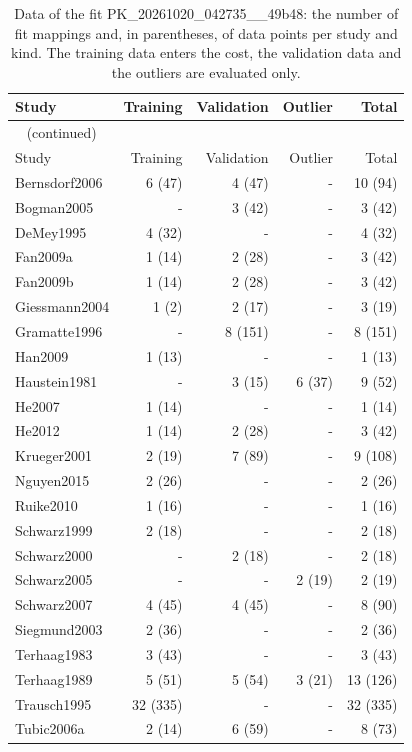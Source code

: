 \documentclass{article}
\begin{document}
\begin{longtable}{lrrrr}
\caption{Data of the fit PK\_20261020\_042735\_\_49b48: the number of fit mappings and, in parentheses, of data points per study and kind. The training data enters the cost, the validation data and the outliers are evaluated only.}\label{tab:data:PK_20261020_042735__49b48} \\
\toprule
Study & Training & Validation & Outlier & Total \\
\midrule
\endfirsthead
\multicolumn{5}{l}{\small\tablename~\thetable{} (continued)} \\
\toprule
Study & Training & Validation & Outlier & Total \\
\midrule
\endhead
\bottomrule
\endlastfoot
Bernsdorf2006 & 6 (47) & 4 (47) & - & 10 (94) \\
Bogman2005 & - & 3 (42) & - & 3 (42) \\
DeMey1995 & 4 (32) & - & - & 4 (32) \\
Fan2009a & 1 (14) & 2 (28) & - & 3 (42) \\
Fan2009b & 1 (14) & 2 (28) & - & 3 (42) \\
Giessmann2004 & 1 (2) & 2 (17) & - & 3 (19) \\
Gramatte1996 & - & 8 (151) & - & 8 (151) \\
Han2009 & 1 (13) & - & - & 1 (13) \\
Haustein1981 & - & 3 (15) & 6 (37) & 9 (52) \\
He2007 & 1 (14) & - & - & 1 (14) \\
He2012 & 1 (14) & 2 (28) & - & 3 (42) \\
Krueger2001 & 2 (19) & 7 (89) & - & 9 (108) \\
Nguyen2015 & 2 (26) & - & - & 2 (26) \\
Ruike2010 & 1 (16) & - & - & 1 (16) \\
Schwarz1999 & 2 (18) & - & - & 2 (18) \\
Schwarz2000 & - & 2 (18) & - & 2 (18) \\
Schwarz2005 & - & - & 2 (19) & 2 (19) \\
Schwarz2007 & 4 (45) & 4 (45) & - & 8 (90) \\
Siegmund2003 & 2 (36) & - & - & 2 (36) \\
Terhaag1983 & 3 (43) & - & - & 3 (43) \\
Terhaag1989 & 5 (51) & 5 (54) & 3 (21) & 13 (126) \\
Trausch1995 & 32 (335) & - & - & 32 (335) \\
Tubic2006a & 2 (14) & 6 (59) & - & 8 (73) \\

\end{longtable}
\end{document}
